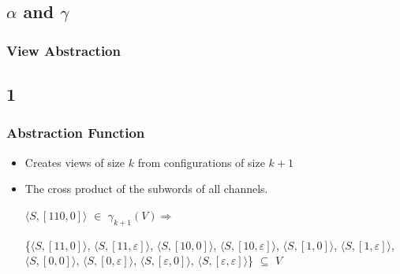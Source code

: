 \documentclass[handout]{beamer}
\begin{document}
\subsection{$\alpha$ and $\gamma$}
\begin{frame}
  \frametitle{View Abstraction} %
  \begin{exampleblock}{}
    \abstraction
  \end{exampleblock}
\end{frame}

\subsection*{1}
\begin{frame}
  \frametitle{Abstraction Function}
  \begin{itemize}
  \item
    Creates views of size $k$ from configurations of size $k+1$
  \item
    The cross product of the subwords of all channels.

    \begin{example}[$\alpha$ for ABP with $k=2$]

    $\langle S, [110,0]\rangle$ $\in$ $\gamma_{k+1}(V) \Rightarrow$

    \{$\langle S, [11, 0]\rangle$, $\langle S, [11, \varepsilon]\rangle$, $\langle S, [10, 0]\rangle$, $\langle S, [10, \varepsilon]\rangle$, $\langle S, [1, 0]\rangle$, $\langle S, [1,\varepsilon ]\rangle$, $\langle S,[0,0]\rangle$, $\langle S, [0,\varepsilon]\rangle$, $\langle S, [\varepsilon, 0]\rangle$, $\langle S, [\varepsilon, \varepsilon]\rangle$\} $\subseteq$ $V$

    \end{example}
  \end{itemize}
\end{frame}
\end{document}
